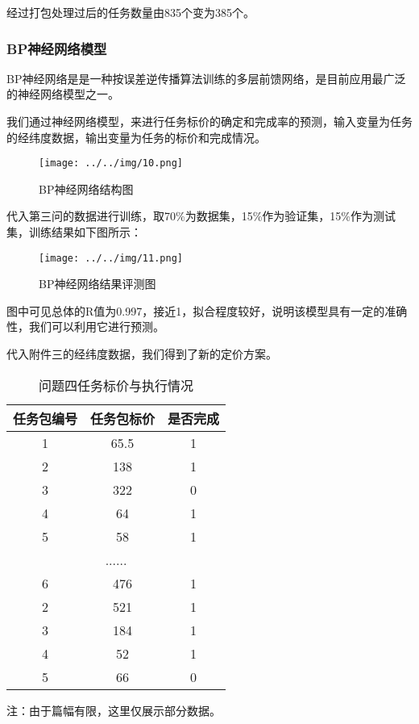 \documentclass[withoutpreface,bwprint]{cumcmthesis} %
\begin{document}
经过打包处理过后的任务数量由835个变为385个。

\subsubsection{BP神经网络模型}
BP神经网络是是一种按误差逆传播算法训练的多层前馈网络，是目前应用最广泛的神经网络模型之一。

我们通过神经网络模型，来进行任务标价的确定和完成率的预测，输入变量为任务的经纬度数据，输出变量为任务的标价和完成情况。

\begin{figure}[H]
	\small
	\centering
	\texttt{[image: ../../img/10.png]}
	\caption{BP神经网络结构图} 
\end{figure}

代入第三问的数据进行训练，取70\%为数据集，15\%作为验证集，15\%作为测试集，训练结果如下图所示：

\begin{figure}[H]
	\small
	\centering
	\texttt{[image: ../../img/11.png]}
	\caption{BP神经网络结果评测图} 
\end{figure}

图中可见总体的R值为0.997，接近1，拟合程度较好，说明该模型具有一定的准确性，我们可以利用它进行预测。

代入附件三的经纬度数据，我们得到了新的定价方案。

\begin{table}[H]
	\centering
	\caption{问题四任务标价与执行情况}
	\begin{threeparttable}       
		\begin{tabular}{|c|c|c|}
			\hline
			任务包编号    & 任务包标价    & 是否完成   \\ \hline
			1        & 65.5     & 1      \\ \hline
			2        & 138      & 1      \\ \hline
			3        & 322      & 0      \\ \hline
			4        & 64       & 1      \\ \hline
			5        & 58       & 1      \\ \hline
			\multicolumn{3}{|c|}{......} \\ \hline
			6        & 476      & 1      \\ \hline
			2        & 521      & 1      \\ \hline
			3        & 184      & 1      \\ \hline
			4        & 52       & 1      \\ \hline
			5        & 66       & 0      \\ \hline
		\end{tabular}
		\begin{tablenotes}
			\footnotesize
			\item 注：由于篇幅有限，这里仅展示部分数据。
		\end{tablenotes}
	\end{threeparttable}     
\end{table}
\end{document}
